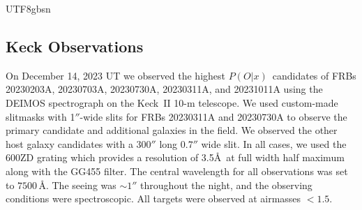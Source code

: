 \documentclass[twocolumn,linenumbers]{aastex631}
\newcommand{\pox}{\ensuremath{P(O|x)}}
\begin{document}
\begin{CJK*}{UTF8}{gbsn}
\subsection{Keck Observations}
On December 14, 2023 UT we observed the highest \pox\
candidates of FRBs 20230203A, 20230703A, 20230730A, 20230311A, and 20231011A using the DEIMOS spectrograph \citep{deimos} on the Keck~II 10-m telescope. We used custom-made slitmasks with 1$''$-wide
slits
for FRBs 20230311A and 20230730A to observe the primary candidate and additional galaxies in the field. 
We observed the other host galaxy candidates with a $300''$ long $0.7''$ wide slit. 
In all cases, we used the 600ZD grating which provides
a resolution of 3.5\AA~at full width half maximum
along with the GG455 filter. The central wavelength for all observations was set to $7500$\,\AA. 
The seeing was $\sim1''$ throughout the night, and the observing conditions were spectroscopic. All targets were observed at airmasses $<1.5$. 


\end{CJK*}
\end{document}
